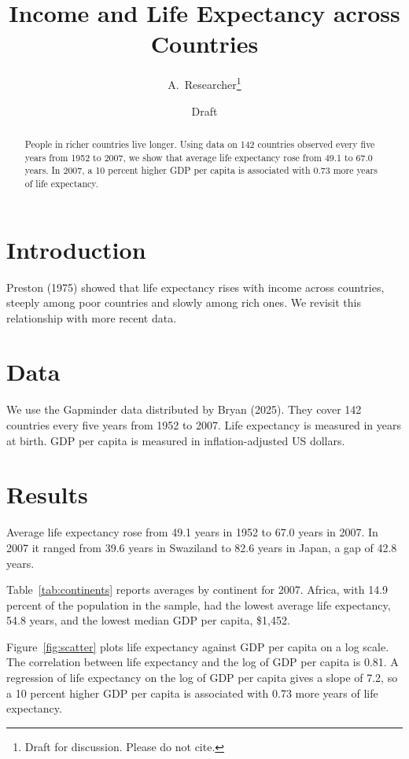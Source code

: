 \documentclass[11pt]{article}
\title{Income and Life Expectancy across Countries}
\author{A.~Researcher\thanks{Draft for discussion. Please do not cite.}}
\date{Draft}
\begin{document}
\maketitle

\begin{abstract}
\noindent People in richer countries live longer. Using data on 142
countries observed every five years from 1952 to 2007, we show that
average life expectancy rose from 49.1 to 67.0 years. In 2007, a 10
percent higher GDP per capita is associated with 0.73 more years of life
expectancy.
\end{abstract}

\section{Introduction}

Preston (1975) showed that life expectancy rises with income across
countries, steeply among poor countries and slowly among rich ones. We
revisit this relationship with more recent data.

\section{Data}

We use the Gapminder data distributed by Bryan (2025). They cover 142
countries every five years from 1952 to 2007. Life expectancy is measured
in years at birth. GDP per capita is measured in inflation-adjusted US
dollars.

\section{Results}

Average life expectancy rose from 49.1 years in 1952 to 67.0 years in
2007. In 2007 it ranged from 39.6 years in Swaziland to 82.6 years in
Japan, a gap of 42.8 years.

Table~\ref{tab:continents} reports averages by continent for 2007. Africa,
with 14.9 percent of the population in the sample, had the lowest average
life expectancy, 54.8 years, and the lowest median GDP per capita,
\$1,452.

Figure~\ref{fig:scatter} plots life expectancy against GDP per capita on a
log scale. The correlation between life expectancy and the log of GDP per
capita is 0.81. A regression of life expectancy on the log of GDP per
capita gives a slope of 7.2, so a 10 percent higher GDP per capita is
associated with 0.73 more years of life expectancy.
\end{document}
